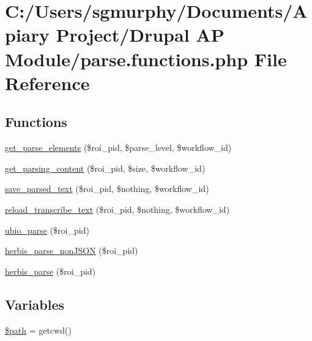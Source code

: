 \hypertarget{parse_8functions_8php}{
\section{C:/Users/sgmurphy/Documents/Apiary Project/Drupal AP Module/parse.functions.php File Reference}
\label{parse_8functions_8php}
}
\subsection*{Functions}
\begin{DoxyCompactItemize}
\item 
\hyperlink{parse_8functions_8php_a2faa0af7bdc3433507fac73b54b32a86}{get\_\-parse\_\-elements} (\$roi\_\-pid, \$parse\_\-level, \$workflow\_\-id)
\item 
\hyperlink{parse_8functions_8php_aa96f5225d54ad2ec39b5f20c8fcfd1c2}{get\_\-parsing\_\-content} (\$roi\_\-pid, \$size, \$workflow\_\-id)
\item 
\hyperlink{parse_8functions_8php_ad1a7ce33f2d558c9379716ac13616ae5}{save\_\-parsed\_\-text} (\$roi\_\-pid, \$nothing, \$workflow\_\-id)
\item 
\hyperlink{parse_8functions_8php_a0a53697541381fa238496ef4853da969}{reload\_\-transcribe\_\-text} (\$roi\_\-pid, \$nothing, \$workflow\_\-id)
\item 
\hyperlink{parse_8functions_8php_abfc7646adccdc888b9888fc3245368ec}{ubio\_\-parse} (\$roi\_\-pid)
\item 
\hyperlink{parse_8functions_8php_a76a5e673d8cc7a610d8ed2024a1ca3c0}{herbis\_\-parse\_\-nonJSON} (\$roi\_\-pid)
\item 
\hyperlink{parse_8functions_8php_afeb088e74d751684f09b5c712d454ea4}{herbis\_\-parse} (\$roi\_\-pid)
\end{DoxyCompactItemize}
\subsection*{Variables}
\begin{DoxyCompactItemize}
\item 
\hyperlink{parse_8functions_8php_a0a4baf0b22973c07685c3981f0d17fc4}{\$path} = getcwd()
\end{DoxyCompactItemize}


